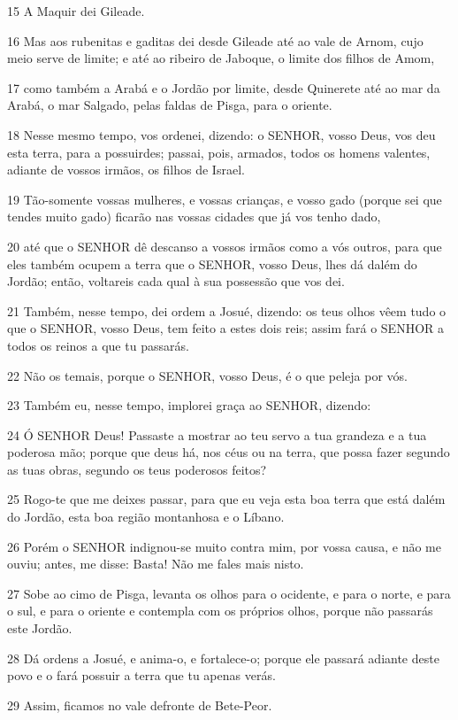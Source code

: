 \par 15 A Maquir dei Gileade.
\par 16 Mas aos rubenitas e gaditas dei desde Gileade até ao vale de Arnom, cujo meio serve de limite; e até ao ribeiro de Jaboque, o limite dos filhos de Amom,
\par 17 como também a Arabá e o Jordão por limite, desde Quinerete até ao mar da Arabá, o mar Salgado, pelas faldas de Pisga, para o oriente.
\par 18 Nesse mesmo tempo, vos ordenei, dizendo: o SENHOR, vosso Deus, vos deu esta terra, para a possuirdes; passai, pois, armados, todos os homens valentes, adiante de vossos irmãos, os filhos de Israel.
\par 19 Tão-somente vossas mulheres, e vossas crianças, e vosso gado (porque sei que tendes muito gado) ficarão nas vossas cidades que já vos tenho dado,
\par 20 até que o SENHOR dê descanso a vossos irmãos como a vós outros, para que eles também ocupem a terra que o SENHOR, vosso Deus, lhes dá dalém do Jordão; então, voltareis cada qual à sua possessão que vos dei.
\par 21 Também, nesse tempo, dei ordem a Josué, dizendo: os teus olhos vêem tudo o que o SENHOR, vosso Deus, tem feito a estes dois reis; assim fará o SENHOR a todos os reinos a que tu passarás.
\par 22 Não os temais, porque o SENHOR, vosso Deus, é o que peleja por vós.
\par 23 Também eu, nesse tempo, implorei graça ao SENHOR, dizendo:
\par 24 Ó SENHOR Deus! Passaste a mostrar ao teu servo a tua grandeza e a tua poderosa mão; porque que deus há, nos céus ou na terra, que possa fazer segundo as tuas obras, segundo os teus poderosos feitos?
\par 25 Rogo-te que me deixes passar, para que eu veja esta boa terra que está dalém do Jordão, esta boa região montanhosa e o Líbano.
\par 26 Porém o SENHOR indignou-se muito contra mim, por vossa causa, e não me ouviu; antes, me disse: Basta! Não me fales mais nisto.
\par 27 Sobe ao cimo de Pisga, levanta os olhos para o ocidente, e para o norte, e para o sul, e para o oriente e contempla com os próprios olhos, porque não passarás este Jordão.
\par 28 Dá ordens a Josué, e anima-o, e fortalece-o; porque ele passará adiante deste povo e o fará possuir a terra que tu apenas verás.
\par 29 Assim, ficamos no vale defronte de Bete-Peor.

